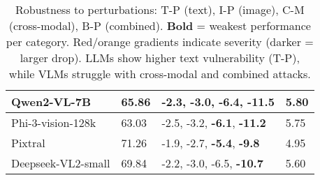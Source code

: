 \begin{table}[h]
{\begin{tabular}{|p{3.2cm}|p{1.2cm}|p{3.3cm}|p{1.2cm}|}
\hline
Qwen2-VL-7B & 65.86 & -2.3, -3.0, \textbf{-6.4}, \cellcolor{red!35} \textbf{-11.5} & \cellcolor{red!25} 5.80 \\ 
\hline
Phi-3-vision-128k & 63.03 & -2.5, -3.2, \textbf{-6.1}, \cellcolor{red!35} \textbf{-11.2} & \cellcolor{red!25} 5.75 \\ 
\hline
Pixtral & 71.26 & -1.9, -2.7, \textbf{-5.4}, \cellcolor{orange!30} \textbf{-9.8} & \cellcolor{orange!20} 4.95 \\ 
\hline
Deepseek-VL2-small & 69.84 & -2.2, -3.0, -6.5, \cellcolor{red!32} \textbf{-10.7} & \cellcolor{red!24} 5.60 \\ 
\hline
\end{tabular}
}
\caption{Robustness to perturbations: T-P (text), I-P (image), C-M (cross-modal), B-P (combined). 
\textbf{Bold} = weakest performance per category. Red/orange gradients indicate severity (darker = larger drop). 
LLMs show higher text vulnerability (T-P), while VLMs struggle with cross-modal and combined attacks.}
\label{tab:perturbations1}
\end{table}